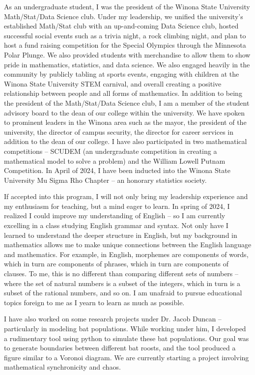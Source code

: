 \documentclass{article}
\begin{document}
\par{As an undergraduate student, I was the president of the Winona State University Math/Stat/Data Science club. Under my leadership, we unified the university's established Math/Stat club with an up-and-coming Data Science club, hosted successful social events such as a trivia night, a rock climbing night, and plan to host a fund raising competition for the Special Olympics through the Minnesota Polar Plunge. We also provided students with merchandise to allow them to show pride in mathematics, statistics, and data science. We also engaged heavily in the community by publicly tabling at sports events, engaging with children at the Winona State University STEM carnival, and overall creating a positive relationship between people and all forms of mathematics. In addition to being the president of the Math/Stat/Data Science club, I am a member of the student advisory board to the dean of our college within the university. We have spoken to prominent leaders in the Winona area such as the mayor, the president of the university, the director of campus security, the director for career services in addition to the dean of our college. I have also participated in two mathematical competitions -- SCUDEM (an undergraduate competition in creating a mathematical model to solve a problem) and the William Lowell Putnam Competition. In April of 2024, I have been inducted into the Winona State University Mu Sigma Rho Chapter -- an honorary statistics society.}

\par{If accepted into this program, I will not only bring my leadership experience and my enthusiasm for teaching, but a mind eager to learn. In spring of 2024, I realized I could improve my understanding of English -- so I am currently excelling in a class studying English grammar and syntax. Not only have I learned to understand the deeper structure in English, but my background in mathematics allows me to make unique connections between the English language and mathematics. For example, in English, morphemes are components of words, which in turn are components of phrases, which in turn are components of clauses. To me, this is no different than comparing different sets of numbers -- where the set of natural numbers is a subset of the integers, which in turn is a subset of the rational numbers, and so on. I am unafraid to pursue educational topics foreign to me as I yearn to learn as much as possible.}
 
\par{I have also worked on some research projects under Dr. Jacob Duncan -- particularly in modeling bat populations. While working under him, I developed a rudimentary tool using python to simulate these bat populations. Our goal was to generate boundaries between different bat roosts, and the tool produced a figure similar to a Voronoi diagram. We are currently starting a project involving mathematical synchronicity and chaos.}
\end{document}
